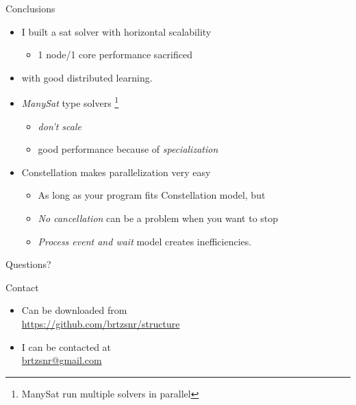 \documentclass[mathserif,serif]{beamer}
\begin{document}
\begin{frame}{Conclusions}
  \begin{itemize}
    \item I built a sat solver with horizontal scalability
    \begin{itemize}
      \item 1 node/1 core performance sacrificed
    \end{itemize}
    \item with good distributed learning.
    \item \emph{ManySat} type solvers
    \footnote{ManySat run multiple solvers in parallel}
    \begin{itemize}
      \item \emph{don't scale}
      \item good performance because of \emph{specialization}
    \end{itemize}
    \item Constellation makes parallelization very easy
    \begin{itemize}
      \item As long as your program fits Constellation model, but
      \item \emph{No cancellation} can be a problem when you want to stop
      \item \emph{Process event and wait} model creates inefficiencies.
    \end{itemize}
  \end{itemize}
\end{frame}

\begin{frame}{Questions?}
  \begin{block}{Contact}
    \begin{itemize}
      \item Can be downloaded from \\ \url{https://github.com/brtzsnr/structure}
      \item I can be contacted at \\ \url{brtzsnr@gmail.com}
    \end{itemize}
  \end{block}


\end{frame}
\end{document}
